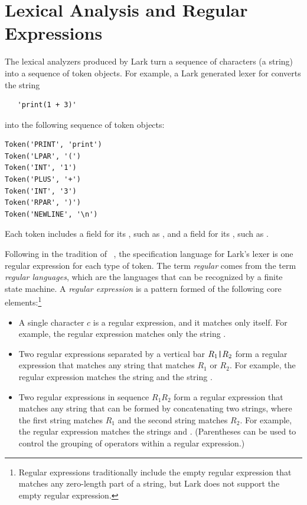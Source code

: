 \documentclass[7x10]{TimesAPriori_MIT}%
\numberwithin{theorem}{chapter}
\numberwithin{definition}{chapter}
\numberwithin{equation}{chapter}
\begin{document}
{\section{Lexical Analysis and Regular Expressions}
\label{sec:lex}

The lexical analyzers produced by Lark turn a sequence of characters
(a string) into a sequence of token objects. For example, a Lark
generated lexer for \LangInt{} converts the string
\begin{lstlisting}
   'print(1 + 3)'
\end{lstlisting}
\noindent into the following sequence of token objects:
\begin{center}
\begin{minipage}{0.95\textwidth}
\begin{lstlisting}
Token('PRINT', 'print')
Token('LPAR', '(')
Token('INT', '1')
Token('PLUS', '+')
Token('INT', '3')
Token('RPAR', ')')
Token('NEWLINE', '\n')
\end{lstlisting}
\end{minipage}
\end{center}
Each token includes a field for its , such as ,
and a field for its , such as .

Following in the tradition of ~\citep{Lesk:1975uq}, the
specification language for Lark's lexer is one regular expression for
each type of token. The term \emph{regular} comes from the term
\emph{regular languages}, which are the languages that can be
recognized by a finite state machine. A \emph{regular expression} is a
pattern formed of the following core elements:\footnote{Regular expressions traditionally include the
  empty regular expression that matches any zero-length part of a
  string, but Lark does not support the empty regular expression.}
\begin{itemize}
\item A single character $c$ is a regular expression, and it matches
  only itself. For example, the regular expression  matches
  only the string .
  
\item Two regular expressions separated by a vertical bar $R_1 \text{\texttt{|}}
  R_2$ form a regular expression that matches any string that matches
  $R_1$ or $R_2$. For example, the regular expression 
  matches the string  and the string .

\item Two regular expressions in sequence $R_1 R_2$ form a regular
  expression that matches any string that can be formed by
  concatenating two strings, where the first string matches $R_1$ and
  the second string matches $R_2$. For example, the regular expression
   matches the strings  and .
  (Parentheses can be used to control the grouping of operators within
  a regular expression.)


\end{itemize}}
\end{document}

